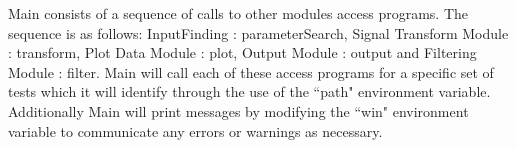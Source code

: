 \documentclass[12pt]{article}
\newcommand{\authornote}[3]{\textcolor{#1}{[#3 ---#2]}}
\newcommand{\authornote}[3]{}
\newcommand{\wss}[1]{\authornote{magenta}{SS}{#1}}
\begin{document}
Main consists of a sequence of calls to other modules access programs. The 
sequence is as follows: InputFinding : parameterSearch, Signal Transform Module 
: transform, Plot Data Module : plot, Output Module : output and 
Filtering Module : filter. Main will call each of these access programs for a 
specific set of tests which it will identify through the use of the ``path" 
environment variable. Additionally Main will print messages by modifying the 
``win" environment variable to communicate any errors or warnings as necessary.


%
%
%
%




\end{document}
